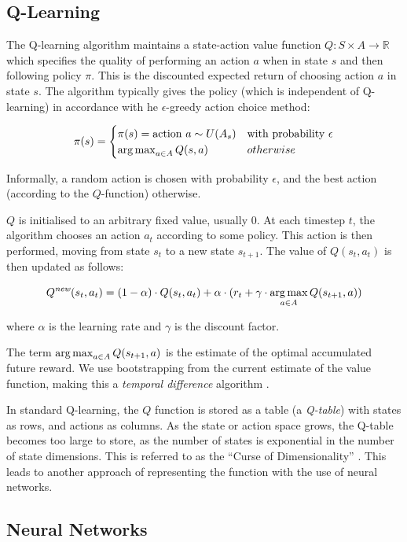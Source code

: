 \subsection{Q-Learning}
The Q-learning algorithm maintains a state-action value function $Q : S \times A \to \mathbb{R}$ which specifies the quality of performing an action $a$ when in state $s$ and then following policy $\pi$. This is the discounted expected return of choosing action $a$ in state $s$. The algorithm typically gives the policy (which is independent of Q-learning) in accordance with he $\epsilon$-greedy action choice method:


\[ \pi(s) = \begin{cases} 
      \pi(s) = \text{action } a \sim U(A_s) & \text{with probability $\epsilon$} \\
      \operatorname*{arg\,max}_{a \in A}Q(s,a) & otherwise                         
   \end{cases}
\]

Informally, a random action is chosen with probability $\epsilon$, and the best action (according to the $Q$-function) otherwise.

$Q$ is initialised to an arbitrary fixed value, usually $0$. At each timestep $t$, the algorithm chooses an action $a_t$ according to some policy. This action is then performed, moving from state $s_t$ to a new state $s_{t+1}$. The value of $Q(s_t,a_t)$ is then updated as follows:

\[Q^{\textit{new}}(s_t,a_t) = (1-\alpha) \cdot Q(s_t,a_t) + \alpha \cdot (r_t + \gamma \cdot \operatorname*{arg\,max}_{a \in A}Q(s_{t+1},a))\]

where $\alpha$ is the learning rate and $\gamma$ is the discount factor.

The term $\operatorname*{arg\,max}_{a \in A}Q(s_{t+1},a)$ is the estimate of the optimal accumulated future reward. We use bootstrapping from the current estimate of the value function, making this a \textit{temporal difference} algorithm \cite{RLAnIntro}.

In standard Q-learning, the $Q$ function is stored as a table (a \textit{Q-table}) with states as rows, and actions as columns. As the state or action space grows, the Q-table becomes too large to store, as the number of states is exponential in the number of state dimensions. This is referred to as the ``Curse of Dimensionality'' \cite{cod}. This leads to another approach of representing the function with the use of neural networks.


\subsection{Neural Networks}

